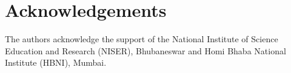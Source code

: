 \documentclass[preprint,sort&compress,12pt]{elsarticle}
\newtheorem{lemma}[theorem]{Lemma}
\newtheorem{prop}[theorem]{Proposition}
\numberwithin{equation}{section}
\theoremstyle{definition}
\begin{document}
\section*{Acknowledgements} 
The authors acknowledge the support of the National Institute of Science Education and Research (NISER), Bhubaneswar and Homi Bhaba National Institute (HBNI), Mumbai.
	








    

% 

\end{document}
